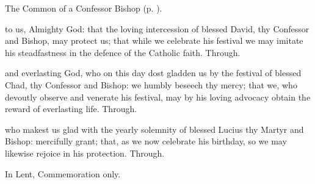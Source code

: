 \begin{rubric}
	The Common of a Confessor Bishop (p. \pageref{CommonConfessorBishop}).
\end{rubric}




\memorialCollect
{} to us, Almighty God: that the loving intercession of blessed David, thy Confessor and Bishop, may protect us; that while we celebrate his festival we may imitate his steadfastness in the defence of the Catholic faith. Through.




\memorialCollect
{} and everlasting God, who on this day dost gladden us by the festival of blessed Chad, thy Confessor and Bishop: we humbly beseech thy mercy; that we, who devoutly observe and venerate his festival, may by his loving advocacy obtain the reward of everlasting life. Through.




\memorialCollect
{} who makest us glad with the yearly solemnity of blessed Lucius thy Martyr and Bishop: mercifully grant; that, as we now celebrate his birthday, so we may likewise rejoice in his protection. Through.


\clearpage
{}

\begin{rubric}
	In Lent, Commemoration only.
\end{rubric}

